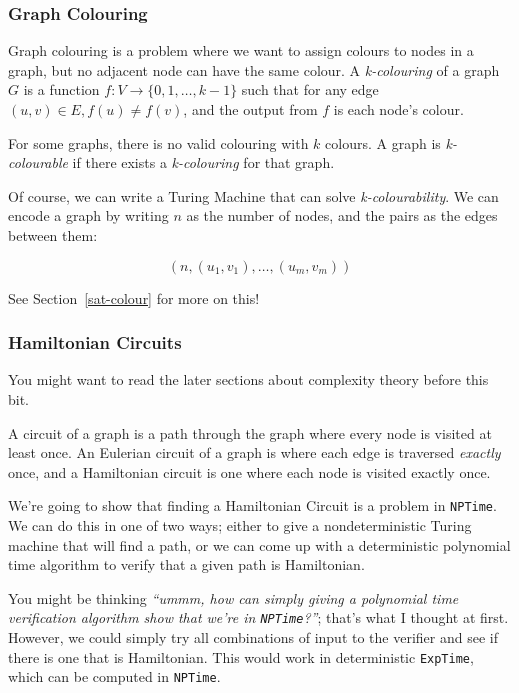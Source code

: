 \subsubsection{Graph Colouring}

Graph colouring is a problem where we want to assign colours to nodes in a
graph, but no adjacent node can have the same colour. A \textit{k-colouring} of
a graph $G$ is a function $f : V \rightarrow \{ 0, 1, \dots, k - 1 \}$ such that
for any edge $(u, v) \in E, f(u) \neq f(v)$, and the output from $f$ is each
node's colour.

For some graphs, there is no valid colouring with $k$ colours. A graph is
\textit{k-colourable} if there exists a \textit{k-colouring} for that graph.

Of course, we can write a Turing Machine that can solve
\textit{k-colourability}. We can encode a graph by writing $n$ as the number of
nodes, and the pairs as the edges between them:

\[
  (n, (u_1, v_1), \dots, (u_m, v_m))
\]

See Section~\ref{sat-colour} for more on this!

\subsubsection{Hamiltonian Circuits}

{\tiny \vspace{-2em} You might want to read the later sections about complexity 
theory before this bit.}

A circuit of a graph is a path through the graph where every node is visited at
least once. An Eulerian circuit of a graph is where each edge is traversed
\textit{exactly} once, and a Hamiltonian circuit is one where each node is
visited exactly once.


We're going to show that finding a Hamiltonian Circuit is a problem in
\texttt{NPTime}. We can do this in one of two ways; either to give a
nondeterministic Turing machine that will find a path, or we can come up with a
deterministic polynomial time algorithm to verify that a given path is
Hamiltonian.

You might be thinking \textit{``ummm, how can simply giving a polynomial time
verification algorithm show that we're in \texttt{NPTime}?''}; that's what I
thought at first. However, we could simply try all combinations of input to the
verifier and see if there is one that is Hamiltonian. This would work in
deterministic \texttt{ExpTime}, which can be computed in \texttt{NPTime}.


